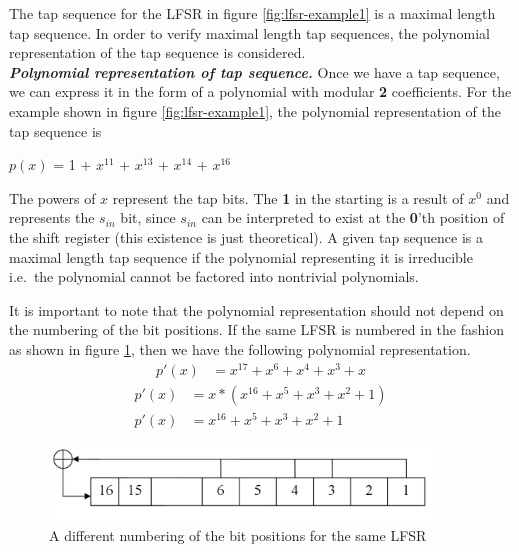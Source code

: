 The tap sequence for the LFSR in figure \ref{fig:lfsr-example1} is a maximal length tap sequence. In order to verify maximal length tap sequences, the polynomial representation of the tap sequence is considered.\\

\noindent \textit{\textbf{Polynomial representation of tap sequence.}} Once we have a tap sequence, we can express it in the form of a polynomial with modular \textbf{2} coefficients. For the example shown in figure \ref{fig:lfsr-example1}, the polynomial representation of the tap sequence is

\begin{center}
$p(x)$ =  1 + $x^{11}$ + $x^{13}$ + $x^{14}$ + $x^{16}$
\end{center}

The powers of $x$ represent the tap bits. The \textbf{1} in the starting is a result of $x^0$ and represents the $s_{in}$ bit, since $s_{in}$ can be interpreted to exist at the \textbf{0}'th position of the shift register (this existence is just theoretical). A given tap sequence is a maximal length tap sequence if the polynomial representing it is irreducible i.e.~the polynomial cannot be factored into nontrivial polynomials.

It is important to note that the polynomial representation should not depend on the numbering of the bit positions. If the same LFSR is numbered in the fashion as shown in figure \ref{fig:lfsr-example2}, then we have the following polynomial representation.
\begin{align*}
p'(x) &= x^{17} + x^{6} + x^{4} + x^{3} + x
\end{align*}
\begin{align}
\label{eq:poly-1} p'(x) &= x*(x^{16} + x^{5} + x^{3} + x^{2} + 1)\\
\label{eq:poly-2} p'(x) &= x^{16} + x^{5} + x^{3} + x^{2} + 1
\end{align}

\begin{figure}[ht!]
	\centering
		\includegraphics[width=4in]{./figures/lfsr-example-reverse.PNG}
	\caption{A different numbering of the bit positions for the same LFSR}	
	\label{fig:lfsr-example2}
\end{figure}

